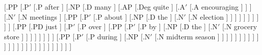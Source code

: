 \documentclass{article}
\begin{document}
\begin{landscape}
{                                                        [.PP [.P$'$ [.{P\degree} after ]
                                                                    [.NP [.{D\textsubscript{\rbrack}} many ]
                                                                         [.AP [.{Deg\textsubscript{\rbrack}} quite ]
                                                                              [.A$'$ [.{A\degree\textsubscript{\rbrack}} encouraging ] ] ]
                                                                         [.N$'$ [.{N\degree\textsubscript{\rbrack}} meetings ]
                                                                                [.PP [.P$'$ [.{P\degree} about ]
                                                                                            [.NP [.{D\textsubscript{\rbrack}} the ]
                                                                                                 [.N$'$ [.{N\degree\textsubscript{\rbrack}} election ] ] ] ] ] ] ] ] ] ]
                                                [.PP [.{PD\textsubscript{\rbrack}} just ]
                                                     [.P$'$ [.{P\degree} over ]
                                                            [.PP [.P$'$ [.{P\degree} by ]
                                                                        [.NP [.{D\textsubscript{\rbrack}} the ]
                                                                             [.N$'$ [.{N\degree\textsubscript{\rbrack}} {grocery store} ] ] ] ] ] ] ] ]
                                         [.PP [.P$'$ [.{P\degree} during ]
                                              [.NP [.N$'$ [.{N\degree\textsubscript{\rbrack}} {midterm season} ] ] ] ] ] ] ] ] ] ] ] ] ] ]
] ] ] ] ] ] ] ] ] ] ] ]
}


\end{landscape}
\end{document}
